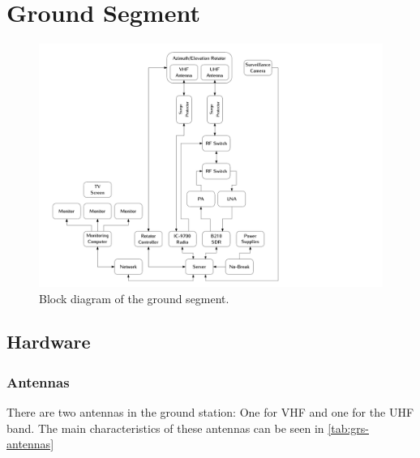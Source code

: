 %
%
%
%
%

%
%
%
%
%
%

\chapter{Ground Segment} \label{ch:ground-segment}

\begin{figure}[!ht]
    \begin{center}
        \includegraphics[width=\textwidth]{figures/grs-block-diagram.pdf}
        \caption{Block diagram of the ground segment.}
        \label{fig:grs-block-diagram}
    \end{center}
\end{figure}

\section{Hardware}

\subsection{Antennas}

There are two antennas in the ground station: One for VHF and one for the UHF band. The main characteristics of these antennas can be seen in \autoref{tab:grs-antennas}

